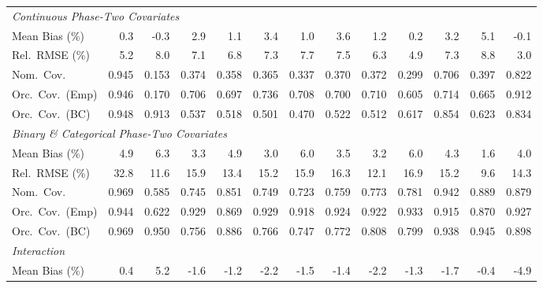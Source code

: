 \begin{landscape}
\begin{table}[!htbp]
{\begin{tabular}{lrrrrrrrrrrrr}
\midrule
\multicolumn{13}{l}{\textit{Continuous Phase-Two Covariates}} \\[2pt]
\quad Mean Bias (\%) & 0.3 & -0.3 & 2.9 & 1.1 & 3.4 & \cellcolor{rankthree}1.0 & 3.6 & 1.2 & \cellcolor{ranktwo}0.2 & 3.2 & 5.1 & \cellcolor{rankone}-0.1 \\
\quad Rel.\ RMSE (\%) & 5.2 & 8.0 & 7.1 & 6.8 & 7.3 & 7.7 & 7.5 & \cellcolor{rankthree}6.3 & \cellcolor{ranktwo}4.9 & 7.3 & 8.8 & \cellcolor{rankone}3.0 \\
\quad Nom.\ Cov. & 0.945 & 0.153 & 0.374 & 0.358 & 0.365 & 0.337 & 0.370 & 0.372 & 0.299 & \cellcolor{ranktwo}0.706 & \cellcolor{rankthree}0.397 & \cellcolor{rankone}0.822 \\
\quad Orc.\ Cov.\ (Emp) & 0.946 & 0.170 & 0.706 & 0.697 & \cellcolor{ranktwo}0.736 & 0.708 & 0.700 & 0.710 & 0.605 & \cellcolor{rankthree}0.714 & 0.665 & \cellcolor{rankone}0.912 \\
\quad Orc.\ Cov.\ (BC) & 0.948 & 0.913 & 0.537 & 0.518 & 0.501 & 0.470 & 0.522 & 0.512 & 0.617 & \cellcolor{rankone}0.854 & \cellcolor{rankthree}0.623 & \cellcolor{ranktwo}0.834 \\
\midrule
\multicolumn{13}{l}{\textit{Binary \& Categorical Phase-Two Covariates}} \\[2pt]
\quad Mean Bias (\%) & 4.9 & 6.3 & 3.3 & 4.9 & \cellcolor{ranktwo}3.0 & 6.0 & 3.5 & \cellcolor{rankthree}3.2 & 6.0 & 4.3 & \cellcolor{rankone}1.6 & 4.0 \\
\quad Rel.\ RMSE (\%) & 32.8 & 11.6 & 15.9 & \cellcolor{rankthree}13.4 & 15.2 & 15.9 & 16.3 & \cellcolor{ranktwo}12.1 & 16.9 & 15.2 & \cellcolor{rankone}9.6 & 14.3 \\
\quad Nom.\ Cov. & 0.969 & 0.585 & 0.745 & 0.851 & 0.749 & 0.723 & 0.759 & 0.773 & 0.781 & \cellcolor{rankone}0.942 & \cellcolor{ranktwo}0.889 & \cellcolor{rankthree}0.879 \\
\quad Orc.\ Cov.\ (Emp) & 0.944 & 0.622 & \cellcolor{ranktwo}0.929 & 0.869 & \cellcolor{ranktwo}0.929 & 0.918 & 0.924 & 0.922 & \cellcolor{rankone}0.933 & 0.915 & 0.870 & \cellcolor{rankthree}0.927 \\
\quad Orc.\ Cov.\ (BC) & 0.969 & 0.950 & 0.756 & 0.886 & 0.766 & 0.747 & 0.772 & 0.808 & 0.799 & \cellcolor{ranktwo}0.938 & \cellcolor{rankone}0.945 & \cellcolor{rankthree}0.898 \\
\midrule
\multicolumn{13}{l}{\textit{Interaction}} \\[2pt]
\quad Mean Bias (\%) & 0.4 & 5.2 & -1.6 & \cellcolor{ranktwo}-1.2 & -2.2 & -1.5 & -1.4 & -2.2 & \cellcolor{rankthree}-1.3 & -1.7 & \cellcolor{rankone}-0.4 & -4.9 \\

\end{tabular}}
\end{table}
\end{landscape}
